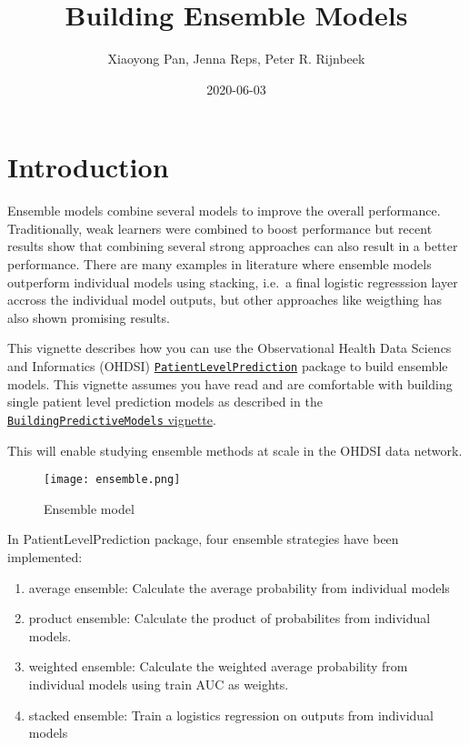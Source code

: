 \documentclass[
]{article}
\title{Building Ensemble Models}
\author{Xiaoyong Pan, Jenna Reps, Peter R. Rijnbeek}
\date{2020-06-03}
\providecommand{\tightlist}{%
  \setlength{\itemsep}{0pt}\setlength{\parskip}{0pt}}
\begin{document}
\maketitle

{
\setcounter{tocdepth}{2}
\tableofcontents
}
\hypertarget{introduction}{%
\section{Introduction}\label{introduction}}

Ensemble models combine several models to improve the overall
performance. Traditionally, weak learners were combined to boost
performance but recent results show that combining several strong
approaches can also result in a better performance. There are many
examples in literature where ensemble models outperform individual
models using stacking, i.e.~a final logistic regresssion layer accross
the individual model outputs, but other approaches like weigthing has
also shown promising results.

This vignette describes how you can use the Observational Health Data
Sciencs and Informatics (OHDSI)
\href{http://github.com/OHDSI/PatientLevelPrediction}{\texttt{PatientLevelPrediction}}
package to build ensemble models. This vignette assumes you have read
and are comfortable with building single patient level prediction models
as described in the
\href{https://github.com/OHDSI/PatientLevelPrediction/blob/master/inst/doc/BuildingPredictiveModels.pdf}{\texttt{BuildingPredictiveModels}
vignette}.

This will enable studying ensemble methods at scale in the OHDSI data
network.

\begin{figure}
\centering
\texttt{[image: ensemble.png]}
\caption{Ensemble model}
\end{figure}

In PatientLevelPrediction package, four ensemble strategies have been
implemented:

\begin{enumerate}
\def\labelenumi{\arabic{enumi}.}
\tightlist
\item
  average ensemble: Calculate the average probability from individual
  models
\item
  product ensemble: Calculate the product of probabilites from
  individual models.
\item
  weighted ensemble: Calculate the weighted average probability from
  individual models using train AUC as weights.
\item
  stacked ensemble: Train a logistics regression on outputs from
  individual models
\end{enumerate}
\end{document}
